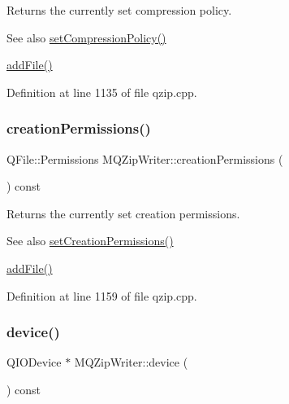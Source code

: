 Returns the currently set compression policy. \begin{DoxySeeAlso}{See also}
\hyperlink{class_m_q_zip_writer_ab4f5f12ae8df67674ec0f3d30d97313f}{set\+Compression\+Policy()} 

\hyperlink{class_m_q_zip_writer_af6d89acc4efc589f0c90c985106e2b00}{add\+File()} 
\end{DoxySeeAlso}


Definition at line 1135 of file qzip.\+cpp.

\mbox{\label{class_m_q_zip_writer_a7ee2e99567e134f338093929469ab818}} 
\subsubsection{\texorpdfstring{creation\+Permissions()}{creationPermissions()}}
{\footnotesize\ttfamily Q\+File\+::\+Permissions M\+Q\+Zip\+Writer\+::creation\+Permissions (\begin{DoxyParamCaption}{ }\end{DoxyParamCaption}) const}

Returns the currently set creation permissions.

\begin{DoxySeeAlso}{See also}
\hyperlink{class_m_q_zip_writer_af965ba3d12531a91ca0c83e25423a313}{set\+Creation\+Permissions()} 

\hyperlink{class_m_q_zip_writer_af6d89acc4efc589f0c90c985106e2b00}{add\+File()} 
\end{DoxySeeAlso}


Definition at line 1159 of file qzip.\+cpp.

\mbox{\label{class_m_q_zip_writer_ad2c9fc653181defe0f54bebd8e0ac21d}} 
\subsubsection{\texorpdfstring{device()}{device()}}
{\footnotesize\ttfamily Q\+I\+O\+Device $\ast$ M\+Q\+Zip\+Writer\+::device (\begin{DoxyParamCaption}{ }\end{DoxyParamCaption}) const}

